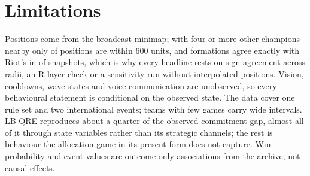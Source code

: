\section{Limitations}
\label{sec:limitations}

Positions come from the broadcast minimap; with four or more other champions nearby only  of positions are within 600 units, and formations agree exactly with Riot's in  of snapshots, which is why every headline rests on sign agreement across radii, an R-layer check or a sensitivity run without interpolated positions.
Vision, cooldowns, wave states and voice communication are unobserved, so every behavioural statement is conditional on the observed state.
The data cover one rule set and two international events; teams with few games carry wide intervals.
LB-QRE reproduces about a quarter of the observed commitment gap, almost all of it through state variables rather than its strategic channels; the rest is behaviour the allocation game in its present form does not capture.
Win probability and event values are outcome-only associations from the archive, not causal effects.
